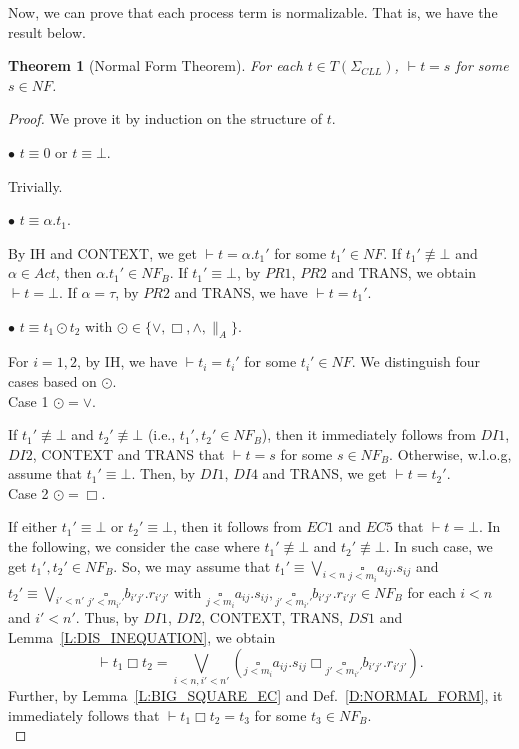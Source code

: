 \documentclass{elsarticle}
\theoremstyle{plain}
\newtheorem{theorem}{Theorem}[section]
\theoremstyle{definition}
\begin{document}
Now, we can prove that each process term is normalizable. That is,  we have the result below.

\begin{theorem}[Normal Form Theorem]\label{T:NORMALFORM}
  For each $t \in T(\Sigma_{CLL})$, $\vdash  t = s$   for some $s \in NF$.
\end{theorem}
\begin{proof}
  We prove it by induction on the structure of  $t$.

\noindent $\bullet$ $t \equiv 0$ or $t \equiv \bot$.

    Trivially.

\noindent $\bullet$ $t \equiv \alpha.t_1$.

        By IH and CONTEXT, we get $\vdash t = \alpha.t_1'$ for some $t_1' \in NF$.
        If $t_1'\not\equiv \bot$ and $\alpha\in Act$, then $\alpha.t_1'\in NF_B$.
        If $t_1' \equiv \bot$, by  $PR1$, $PR2$ and TRANS, we obtain $\vdash t = \bot$.
        If $\alpha = \tau$, by $PR2$ and TRANS, we have  $\vdash t = t_1'$.

\noindent $\bullet$ $t \equiv t_1 \odot t_2$ with $\odot \in \{\vee,\Box,\wedge,\parallel_A\}$.

        For $i=1,2$, by IH, we have $\vdash t_i = t_i'$ for some $t_i'\in NF$. We distinguish four cases based on $\odot$.\\

\noindent Case 1 $\odot = \vee$.

        If  $t_1' \not\equiv \bot$  and  $t_2' \not\equiv \bot$ (i.e., $t_1',t_2'\in NF_B$), then it immediately follows from $DI1$, $DI2$, CONTEXT and TRANS that $\vdash t = s$ for some $s \in NF_B$.
        Otherwise, w.l.o.g, assume that $t_1' \equiv \bot$.
        Then, by $DI1$, $DI4$ and TRANS, we get $\vdash  t = t_2'$.\\

\noindent Case 2 $\odot = \Box$.

        If either $t_1' \equiv \bot$ or $t_2' \equiv \bot$,  then it follows from $EC1$ and $EC5$ that $\vdash  t = \bot$.
        In the following, we consider the case where $t_1' \not\equiv \bot$ and $t_2' \not\equiv \bot$.
        In such case, we get $t_1',t_2'\in NF_B$.
        So, we may assume that $t_1' \equiv \underset{i< n}{\bigvee}\underset{j<m_i}\square a_{ij}.s_{ij}$ and $t_2' \equiv \underset{i'< n'}{\bigvee}\underset{j'<m_{i'}'}\square b_{i'j'}.r_{i'j'}$ with $\underset{j<m_i}\square a_{ij}.s_{ij},\underset{j'<m_{i'}'}\square b_{i'j'}.r_{i'j'}\in NF_B$ for each $i<n$ and $i'<n'$.
        Thus, by $DI1$, $DI2$, CONTEXT, TRANS, $DS1$ and Lemma~\ref{L:DIS_INEQUATION},  we obtain
        \[\vdash t_1 \Box t_2 =
        \underset{i < n, i' < n'}{\bigvee}(\underset{j<m_i}\square a_{ij}.s_{ij} \Box \underset{j'<m_{i'}'}\square b_{i'j'}.r_{i'j'}).\]
        Further, by Lemma~\ref{L:BIG_SQUARE_EC} and Def.~\ref{D:NORMAL_FORM}, it immediately follows that $\vdash t_1 \Box t_2 = t_3$ for some $t_3\in NF_B$.\\


\end{proof}
\end{document}

